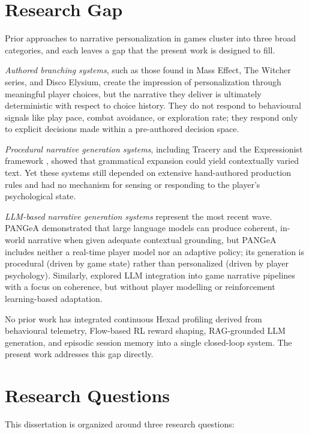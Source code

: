 \section{Research Gap}

Prior approaches to narrative personalization in games cluster into three broad categories, and each leaves a gap that the present work is designed to fill.

\textit{Authored branching systems}, such as those found in Mass Effect, The Witcher series, and Disco Elysium, create the impression of personalization through meaningful player choices, but the narrative they deliver is ultimately deterministic with respect to choice history. They do not respond to behavioural signals like play pace, combat avoidance, or exploration rate; they respond only to explicit decisions made within a pre-authored decision space.

\textit{Procedural narrative generation systems}, including Tracery \citep{compton2015tracery} and the Expressionist framework \citep{kreminski2019evaluating}, showed that grammatical expansion could yield contextually varied text. Yet these systems still depended on extensive hand-authored production rules and had no mechanism for sensing or responding to the player's psychological state.

\textit{LLM-based narrative generation systems} represent the most recent wave. PANGeA \citep{todd2024pangea} demonstrated that large language models can produce coherent, in-world narrative when given adequate contextual grounding, but PANGeA includes neither a real-time player model nor an adaptive policy; its generation is procedural (driven by game state) rather than personalized (driven by player psychology). Similarly, \citet{ligs2025chi} explored LLM integration into game narrative pipelines with a focus on coherence, but without player modelling or reinforcement learning-based adaptation.

No prior work has integrated continuous Hexad profiling derived from behavioural telemetry, Flow-based RL reward shaping, RAG-grounded LLM generation, and episodic session memory into a single closed-loop system. The present work addresses this gap directly.

\section{Research Questions}

This dissertation is organized around three research questions:

